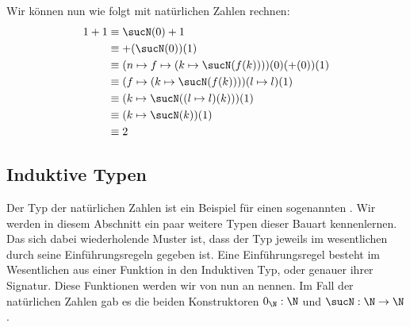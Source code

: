 \begin{beispiel}
  Wir können nun wie folgt mit natürlichen Zahlen rechnen:
  \begin{align*}
    1+1 & \equiv \sucN(0)+1 \\
        & \equiv +(\sucN(0))(1) \\
        & \equiv (n \mapsto f \mapsto (k \mapsto \sucN(f(k))))(0)(+(0))(1) \\
        & \equiv (f \mapsto (k \mapsto \sucN(f(k))))(l \mapsto l)(1) \\
        & \equiv (k \mapsto \sucN((l \mapsto l)(k)))(1) \\
        & \equiv (k \mapsto \sucN(k))(1) \\
        & \equiv 2 \\
  \end{align*}
\end{beispiel}

\subsection{Induktive Typen}
Der Typ der natürlichen Zahlen ist ein Beispiel für einen sogenannten .
Wir werden in diesem Abschnitt ein paar weitere Typen dieser Bauart kennenlernen.
Das sich dabei wiederholende Muster ist, dass der Typ jeweils im wesentlichen durch seine Einführungsregeln gegeben ist.
Eine Einführungsregel besteht im Wesentlichen aus einer Funktion in den Induktiven Typ, oder genauer ihrer Signatur.
Diese Funktionen werden wir von nun an  nennen.
Im Fall der natürlichen Zahlen gab es die beiden Konstruktoren $0_{\N}:\N$ und $\sucN:\N\to\N$.

